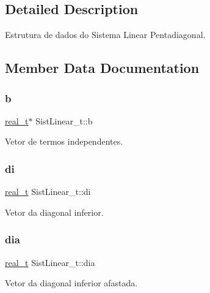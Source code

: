 \subsection{Detailed Description}
Estrutura de dados do Sistema Linear Pentadiagonal. 

\subsection{Member Data Documentation}
\mbox{\label{structSistLinear__t_a5f554632eec68e5e0dbea0058c9657ac}} 
\subsubsection{\texorpdfstring{b}{b}}
{\footnotesize\ttfamily \hyperlink{SistemasLineares_8h_a0d00e2b3dfadee81331bbb39068570c4}{real\+\_\+t}$\ast$ Sist\+Linear\+\_\+t\+::b}

Vetor de termos independentes. \mbox{\label{structSistLinear__t_a697bd2cd155a3d860f6df76738a5149c}} 
\subsubsection{\texorpdfstring{di}{di}}
{\footnotesize\ttfamily \hyperlink{SistemasLineares_8h_a0d00e2b3dfadee81331bbb39068570c4}{real\+\_\+t} Sist\+Linear\+\_\+t\+::di}

Vetor da diagonal inferior. \mbox{\label{structSistLinear__t_a304278b13b51650f8d6e6482311918c8}} 
\subsubsection{\texorpdfstring{dia}{dia}}
{\footnotesize\ttfamily \hyperlink{SistemasLineares_8h_a0d00e2b3dfadee81331bbb39068570c4}{real\+\_\+t} Sist\+Linear\+\_\+t\+::dia}

Vetor da diagonal inferior afastada. \mbox{\label{structSistLinear__t_ac7f13772865711ff339023fc6ca5ab96}} 
